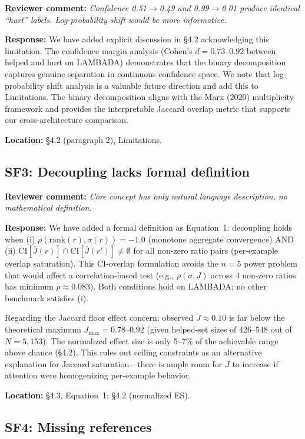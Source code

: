\documentclass[11pt]{article}
\newcommand{\reviewer}[1]{\textcolor{reviewercolor}{\textbf{Reviewer comment:} \textit{#1}}}
\newcommand{\response}[1]{\textcolor{responsecolor}{\textbf{Response:} #1}}
\newcommand{\location}[1]{\textbf{Location:} #1}
\begin{document}
\reviewer{Confidence 0.51$\to$0.49 and 0.99$\to$0.01 produce identical ``hurt'' labels. Log-probability shift would be more informative.}

\response{We have added explicit discussion in \S4.2 acknowledging this limitation. The confidence margin analysis (Cohen's $d = 0.73$--$0.92$ between helped and hurt on LAMBADA) demonstrates that the binary decomposition captures genuine separation in continuous confidence space. We note that log-probability shift analysis is a valuable future direction and add this to Limitations. The binary decomposition aligns with the Marx (2020) multiplicity framework and provides the interpretable Jaccard overlap metric that supports our cross-architecture comparison.}

\location{\S4.2 (paragraph 2), Limitations.}

\subsection*{SF3: Decoupling lacks formal definition}

\reviewer{Core concept has only natural language description, no mathematical definition.}

\response{We have added a formal definition as Equation~1: decoupling holds when (i) $\rho(\mathrm{rank}(r), \sigma(r)) = -1.0$ (monotone aggregate convergence) AND (ii) $\mathrm{CI}[\bar{J}(r)] \cap \mathrm{CI}[\bar{J}(r')] \neq \emptyset$ for all non-zero ratio pairs (per-example overlap saturation). This CI-overlap formulation avoids the $n = 5$ power problem that would affect a correlation-based test (e.g., $\rho(\sigma, J)$ across 4 non-zero ratios has minimum $p \approx 0.083$). Both conditions hold on LAMBADA; no other benchmark satisfies (i).

Regarding the Jaccard floor effect concern: observed $\bar{J} \approx 0.10$ is far below the theoretical maximum $J_{\max} = 0.78$--$0.92$ (given helped-set sizes of 426--548 out of $N = 5{,}153$). The normalized effect size is only 5--7\% of the achievable range above chance (\S4.2). This rules out ceiling constraints as an alternative explanation for Jaccard saturation---there is ample room for $J$ to increase if attention were homogenizing per-example behavior.}

\location{\S4.3, Equation~1; \S4.2 (normalized ES).}

\subsection*{SF4: Missing references}
\end{document}
